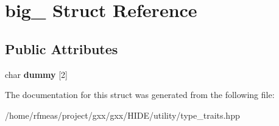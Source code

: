 \hypertarget{structbig__}{}\section{big\+\_\+ Struct Reference}
\label{structbig__}
\subsection*{Public Attributes}
\begin{DoxyCompactItemize}
\item 
char {\bfseries dummy} \mbox{[}2\mbox{]}\hypertarget{structbig___a08072dda4df56b0f7f3916f97d523f1a}{}\label{structbig___a08072dda4df56b0f7f3916f97d523f1a}

\end{DoxyCompactItemize}


The documentation for this struct was generated from the following file\+:\begin{DoxyCompactItemize}
\item 
/home/rfmeas/project/gxx/gxx/\+H\+I\+D\+E/utility/type\+\_\+traits.\+hpp\end{DoxyCompactItemize}
